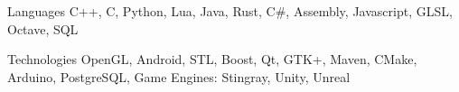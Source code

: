 


\begin{cvskills}


\cvskill
{Languages} %
{C++, C, Python, Lua, Java, Rust, C\#, Assembly, Javascript, GLSL, Octave, SQL } %


\cvskill
{Technologies}
{OpenGL, Android, STL, Boost, Qt, GTK+, Maven, CMake, Arduino, PostgreSQL, Game Engines: Stingray, Unity, Unreal}



\end{cvskills}
